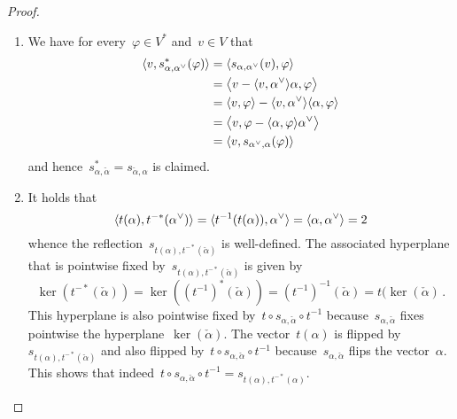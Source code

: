 \begin{proof}
  \leavevmode
  \begin{enumerate}
    \item
      We have for every~$\varphi \in V^*$ and~$v \in V$ that
      \begin{align*}
        \pair{v, s_{\alpha, \check{\alpha}}^*(\varphi)}
        &=
        \pair{s_{\alpha, \check{\alpha}}(v), \varphi}
        \\
        &=
        \pair[\big]{v - \pair{v, \check{\alpha}} \alpha, \varphi}
        \\
        &=
        \pair{v, \varphi} - \pair{v, \check{\alpha}} \pair{\alpha, \varphi}
        \\
        &=
        \pair[\big]{v, \varphi - \pair{\alpha, \varphi} \check{\alpha}}
        \\
        &=
        \pair{v, s_{\check{\alpha}, \alpha}(\varphi)}
      \end{align*}
      and hence~$s_{\alpha, \check{\alpha}}^* = s_{\check{\alpha}, \alpha}$ is claimed.
    \item
      It holds that
      \[
        \pair{t(\alpha), t^{-*}(\check{\alpha})}
        =
        \pair{t^{-1}(t(\alpha)), \check{\alpha}}
        =
        \pair{\alpha, \check{\alpha}}
        =
        2
      \]
      whence the reflection~$s_{t(\alpha), t^{-*}(\check{\alpha})}$ is well-defined.
      The associated hyperplane that is pointwise fixed by~$s_{t(\alpha), t^{-*}(\check{\alpha})}$ is given by
      \[
        \ker(t^{-*}(\check{\alpha}))
        =
        \ker((t^{-1})^*(\check{\alpha}))
        =
        (t^{-1})^{-1}(\check{\alpha})
        =
        t(\ker(\check{\alpha}) \,.
      \]
      This hyperplane is also pointwise fixed by~$t \circ s_{\alpha, \check{\alpha}} \circ t^{-1}$ because~$s_{\alpha, \check{\alpha}}$ fixes pointwise the hyperplane~$\ker(\check{\alpha})$.
      The vector~$t(\alpha)$ is flipped by~$s_{t(\alpha), t^{-*}(\check{\alpha})}$ and also flipped by~$t \circ s_{\alpha, \check{\alpha}} \circ t^{-1}$ because~$s_{\alpha, \check{\alpha}}$ flips the vector~$\alpha$.
      This shows that indeed~$t \circ s_{\alpha, \check{\alpha}} \circ t^{-1} = s_{t(\alpha), t^{-*}(\alpha)}$.
    \qedhere
  \end{enumerate}
\end{proof}

% 

